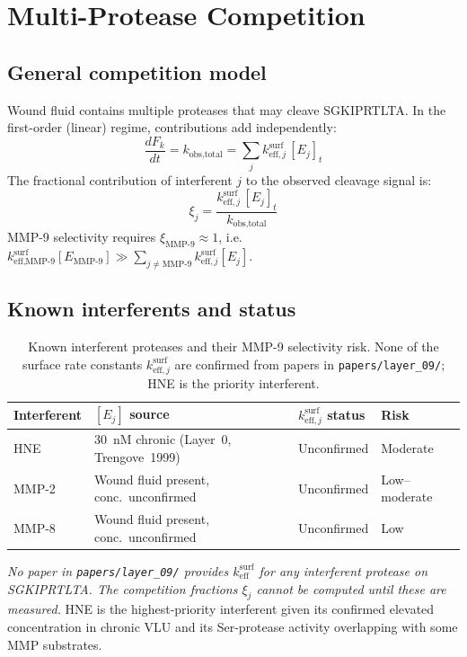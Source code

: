 \documentclass[10pt,a4paper]{article}
\numberwithin{equation}{section}
\begin{document}
\section{Multi-Protease Competition}
\label{sec:competition}

\subsection{General competition model}

Wound fluid contains multiple proteases that may cleave SGKIPRTLTA. In the first-order
(linear) regime, contributions add independently:
\begin{equation}
  \label{eq:competition}
  \frac{dF_k}{dt} = k_{\text{obs,total}} = \sum_j k_{\text{eff},j}^{\text{surf}}\,[E_j]_t
\end{equation}
The fractional contribution of interferent $j$ to the observed cleavage signal is:
\begin{equation}
  \label{eq:interferent}
  \xi_j = \frac{k_{\text{eff},j}^{\text{surf}}\,[E_j]_t}{k_{\text{obs,total}}}
\end{equation}
MMP-9 selectivity requires $\xi_{\text{MMP-9}} \approx 1$, i.e.\
$k_{\text{eff,MMP-9}}^{\text{surf}}[E_{\text{MMP-9}}] \gg \sum_{j \neq \text{MMP-9}}
k_{\text{eff},j}^{\text{surf}}[E_j]$.

\subsection{Known interferents and status}

\begin{table}[H]
\centering
\small\renewcommand{\arraystretch}{1.25}
\begin{tabularx}{\linewidth}{@{}lXll@{}}
\toprule
Interferent & $[E_j]$ source & $k_{\text{eff},j}^{\text{surf}}$ status & Risk \\
\midrule
HNE    & 30~nM chronic (Layer~0, Trengove~1999) & Unconfirmed & Moderate \\
MMP-2  & Wound fluid present, conc.\ unconfirmed & Unconfirmed & Low--moderate \\
MMP-8  & Wound fluid present, conc.\ unconfirmed & Unconfirmed & Low \\
\bottomrule
\end{tabularx}
\caption{Known interferent proteases and their MMP-9 selectivity risk.
None of the surface rate constants $k_{\text{eff},j}^{\text{surf}}$ are confirmed
from papers in \texttt{papers/layer\_09/}; HNE is the priority interferent.}
\label{tab:interferents}
\end{table}
\textit{No paper in \texttt{papers/layer\_09/} provides $k_{\text{eff}}^{\text{surf}}$ for any
interferent protease on SGKIPRTLTA. The competition fractions $\xi_j$ cannot be
computed until these are measured.} HNE is the highest-priority interferent given its
confirmed elevated concentration in chronic VLU and its Ser-protease activity
overlapping with some MMP substrates.
\end{document}
